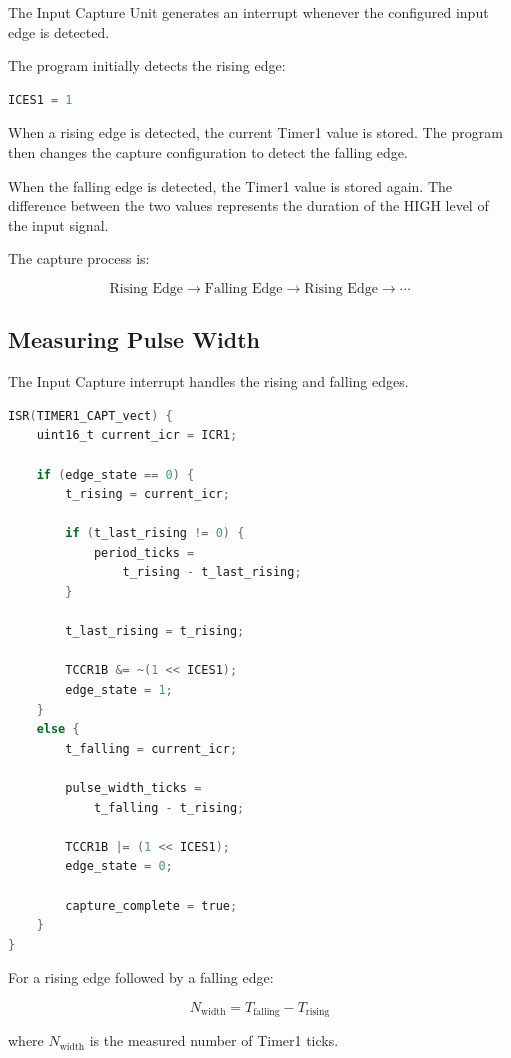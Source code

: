 \documentclass[12pt,a4paper]{article}
\begin{document}
The Input Capture Unit generates an interrupt whenever the configured
input edge is detected.

The program initially detects the rising edge:

\begin{lstlisting}[language=C]
ICES1 = 1
\end{lstlisting}

When a rising edge is detected, the current Timer1 value is stored.
The program then changes the capture configuration to detect the
falling edge.

When the falling edge is detected, the Timer1 value is stored again.
The difference between the two values represents the duration of the
HIGH level of the input signal.

The capture process is:

\[
\text{Rising Edge}
\rightarrow
\text{Falling Edge}
\rightarrow
\text{Rising Edge}
\rightarrow
\cdots
\]

\subsection{Measuring Pulse Width}

The Input Capture interrupt handles the rising and falling edges.

\begin{lstlisting}[language=C]
ISR(TIMER1_CAPT_vect) {
    uint16_t current_icr = ICR1;

    if (edge_state == 0) {
        t_rising = current_icr;

        if (t_last_rising != 0) {
            period_ticks =
                t_rising - t_last_rising;
        }

        t_last_rising = t_rising;

        TCCR1B &= ~(1 << ICES1);
        edge_state = 1;
    }
    else {
        t_falling = current_icr;

        pulse_width_ticks =
            t_falling - t_rising;

        TCCR1B |= (1 << ICES1);
        edge_state = 0;

        capture_complete = true;
    }
}
\end{lstlisting}

For a rising edge followed by a falling edge:

\[
N_{\mathrm{width}}
=
T_{\mathrm{falling}}
-
T_{\mathrm{rising}}
\]

where $N_{\mathrm{width}}$ is the measured number of Timer1 ticks.
\end{document}
